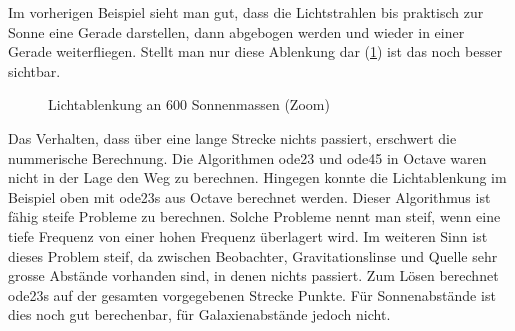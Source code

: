 \begin{refsection}
Im vorherigen Beispiel sieht man gut, dass die Lichtstrahlen bis
praktisch zur Sonne eine Gerade darstellen, dann abgebogen werden und
wieder in einer Gerade weiterfliegen.  Stellt man nur diese Ablenkung
dar (\ref{fig:lichtablenkung600SonneZoom}) ist das noch besser
sichtbar.

\begin{figure}
  \centering
  \caption{Lichtablenkung an 600 Sonnenmassen (Zoom)}
  \label{fig:lichtablenkung600SonneZoom}
\end{figure}

Das Verhalten, dass über eine lange Strecke nichts passiert, erschwert
die nummerische Berechnung.  Die Algorithmen ode23 und ode45 in Octave
waren nicht in der Lage den Weg zu berechnen.  Hingegen konnte die
Lichtablenkung im Beispiel oben mit ode23s aus Octave berechnet
werden.  Dieser Algorithmus ist fähig steife Probleme zu berechnen.
Solche Probleme nennt man steif, wenn eine tiefe Frequenz von einer
hohen Frequenz überlagert wird.  Im weiteren Sinn ist dieses Problem
steif, da zwischen Beobachter, Gravitationslinse und Quelle sehr
grosse Abstände vorhanden sind, in denen nichts passiert.  Zum Lösen
berechnet ode23s auf der gesamten vorgegebenen Strecke Punkte.  Für
Sonnenabstände ist dies noch gut berechenbar, für Galaxienabstände
jedoch nicht.


\printbibliography[heading=subbibliography]
\end{refsection}


